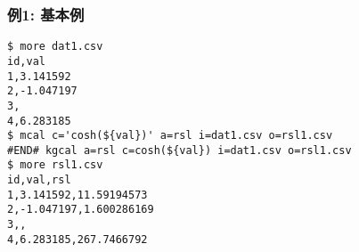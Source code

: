 \subsubsection*{例1: 基本例}



\begin{Verbatim}[baselinestretch=0.7,frame=single]
$ more dat1.csv
id,val
1,3.141592
2,-1.047197
3,
4,6.283185
$ mcal c='cosh(${val})' a=rsl i=dat1.csv o=rsl1.csv
#END# kgcal a=rsl c=cosh(${val}) i=dat1.csv o=rsl1.csv
$ more rsl1.csv
id,val,rsl
1,3.141592,11.59194573
2,-1.047197,1.600286169
3,,
4,6.283185,267.7466792
\end{Verbatim}
